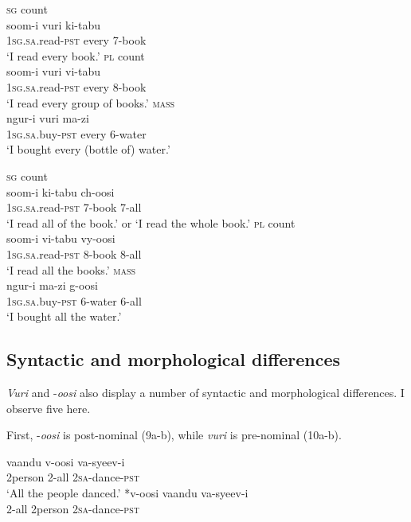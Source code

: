 \documentclass[output=paper]{langsci/langscibook}
\begin{document}
\ea\label{ex:landman:7}
\ea\label{ex:landman:7a}
\textsc{sg} count\\
\gll soom-i      vuri    ki-tabu    \\
     1\textsc{sg.sa}.read-\textsc{pst}  every    7-book  \\
\glt ‘I read every book.’
\ex\label{ex:landman:7b}
\textsc{pl} count\\
\gll soom-i      vuri    vi-tabu    \\
     1\textsc{sg.sa}.read-\textsc{pst}  every    8-book\\
\glt ‘I read every group of books.’
\ex\label{ex:landman:7c}
\textsc{mass}\\
\gll ngur-i      vuri    ma-zi    \\
     1\textsc{sg.sa}.buy-\textsc{pst}    every    6-water\\
\glt ‘I bought every (bottle of) water.’
\z
\z

\ea\label{ex:landman:8}
\ea\label{ex:landman:8a}
\textsc{sg} count\\
\gll soom-i      ki-tabu  ch-oosi    \\
     1\textsc{sg.sa}.read-\textsc{pst}  7-book  7-all\\
\glt ‘I read all of the book.’ or ‘I read the whole book.’
\ex\label{ex:landman:8b}
\textsc{pl} count\\
\gll soom-i      vi-tabu  vy-oosi  \\
     1\textsc{sg.sa}.read-\textsc{pst}  8-book  8-all\\
\glt ‘I read all the books.’
\ex\label{ex:landman:8c}
\textsc{mass}\\
\gll ngur-i      ma-zi    g-oosi  \\
     1\textsc{sg.sa}.buy-\textsc{pst}    6-water  6-all\\
\glt ‘I bought all the water.’
\z
\z

\subsection{Syntactic and morphological differences}

\textit{Vuri} and -\textit{oosi} also display a number of syntactic and morphological differences. I observe five here.

First, -\textit{oosi} is post-nominal (9a-b), while \textit{vuri} is pre-nominal (10a-b). 

\ea\label{ex:landman:9}
\ea
\gll vaandu    v-oosi    va-syeev-i    \\
     2person    2-all    2\textsc{sa}-dance-\textsc{pst}       \\
\glt ‘All the people danced.’
\ex\label{ex:landman:9b}
\gll \textup{*}v-oosi    vaandu  va-syeev-i  \\
     2-all    2person  2\textsc{sa}-dance-\textsc{pst}  \\
\z
\z
\end{document}

